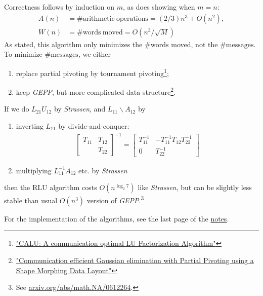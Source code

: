 \documentclass[11pt]{article}
\numberwithin{equation}{section}
\begin{document}
Correctness follows by induction on $m$, as does showing when $m=n$: \begin{align*}
    A(n) &= \#\mathrm{arithmetic\  operations} = (2/3)n^3 + O(n^2),\\
    W(n) &= \#\mathrm{words\  moved} = O(n^3/\sqrt{M})
\end{align*}
As stated, this algorithm only minimizes the $\#\mathrm{words}$ moved, not the $\#\mathrm{messages}$. To minimize $\#\mathrm{messages}$, we either 
\begin{enumerate}
    \item replace partial pivoting by tournament pivoting\footnote{\href{https://epubs.siam.org/doi/pdf/10.1137/100788926}{"CALU: A communication optimal LU Factorization Algorithm"}};
    \item keep \textit{GEPP}, but more complicated data structure\footnote{\href{https://dl.acm.org/doi/pdf/10.1145/2486159.2486198}{"Communication efficient Gaussian elimination with Partial Pivoting using a Shape Morphing Data Layout"}}.
\end{enumerate}

\begin{fact}
    If we do $L_{21} U_{12}$ by \textit{Strassen}, and $L_{11} \backslash A_{12}$ by \begin{enumerate}
        \item inverting $L_{11}$ by divide-and-conquer: \begin{align*}
            \left[\begin{array}{cc}
                T_{11} & T_{12} \\
                & T_{22}
                \end{array}\right]^{-1}=\left[\begin{array}{cc}
                    T_{11}^{-1} & -T_{11}^{-1} T_{12} T_{22}^{-1} \\
                    0 & T_{22}^{-1}
                    \end{array}\right]
        \end{align*}
        \item multiplying $L_{11}^{-1}A_{12}$ etc. by \textit{Strassen}
    \end{enumerate}
    then the RLU algorithm costs $O(n^{\log_2 7})$ like \textit{Strassen}, but can be slightly less stable than usual $O(n^3)$ version of \textit{GEPP}.\footnote{See \url{arxiv.org/abs/math.NA/0612264}.}
\end{fact}

For the implementation of the algorithms, see the last page of the \href{https://people.eecs.berkeley.edu/~demmel/ma221_Fall20/Lectures/Lecture_05.pdf}{notes}.
\end{document}
